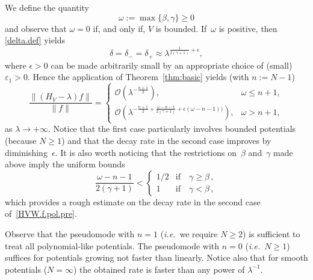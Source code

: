 \begin{Example}
We define the quantity
\begin{equation}\label{omega.def}
  \omega := \max\{\beta,\gamma\} \geq 0
\end{equation}
and observe that $\omega=0$ if, and only if, $V$ is bounded.
If~$\omega$ is positive, then \eqref{delta.def} yields
\begin{equation}\label{delta.estimate}
\delta =\delta_- = \delta_+ \approx 
\lambda^{\frac1{2(\gamma+1)}+\epsilon},
\end{equation}
where $\epsilon>0$ can be made arbitrarily small by an appropriate choice of (small) ${\varepsilon}_1>0$.
Hence the application of Theorem~\ref{thm:basic} yields  (with $n:=N-1$)
\begin{equation}\label{HVW.f.pol.pre}
\frac{\|(H_V -\lambda) f\|}{\|f\|} = 
\begin{cases}
{\mathcal{O}} \left(\lambda^{- \frac{n+1}2} \right), & \omega \leq n+1, 
\\[2mm]
{\mathcal{O}} \left(\lambda^{- \frac{n+1}{2} 
+ \frac{\omega-n-1}{2(\gamma+1)} + \epsilon(\omega-n-1))  } \right), 
& \omega > n+1, 
\end{cases}
\end{equation}
as $\lambda \to +\infty$.
Notice that the first case particularly involves bounded potentials (because $N \geq 1$)
and that the decay rate in the second case improves by diminishing~$\epsilon$.
It is also worth noticing that the restrictions on~$\beta$ and~$\gamma$ made above
imply the uniform bounds
\begin{equation}\label{uniform}
  \frac{\omega-n-1}{2(\gamma+1)} < 
  \begin{cases}
    1/2 & \mbox{if} \quad \gamma \geq \beta \,,
    \\
    1 & \mbox{if} \quad \gamma < \beta \,,
  \end{cases}
\end{equation}
which provides a rough estimate on the decay rate 
in the second case of~\eqref{HVW.f.pol.pre}. 

Observe that the pseudomode with $n=1$ 
({\emph{i.e.}}~we require $N\geq 2$) 
is sufficient to treat all polynomial-like potentials. 
The pseudomode with $n=0$ ({\emph{i.e.}}~$N\geq1$)
suffices for potentials growing not faster than linearly.
Notice also that for smooth potentials ($N=\infty$) the obtained rate is faster 
than any power of $\lambda^{-1}$.
\end{Example}

